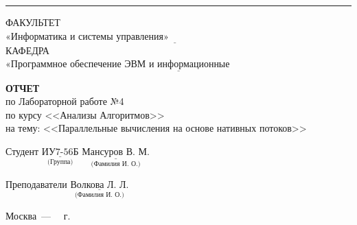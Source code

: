 \begin{titlepage}
	\noindent\rule{18cm}{3pt}
	\newline\newline
	\noindent ФАКУЛЬТЕТ $\underline{\text{«Информатика и системы управления»~~~~~~~~~~~~~~~~~~~~~~~~~~~~~~~~~~~~~~~~~~~~~~~~~~~~~~~}}$ \newline\newline
	\noindent КАФЕДРА $\underline{\text{«Программное обеспечение ЭВМ и информационные технологии»~~~~~~~~~~~~~~~~~~~~~~~}}$\newline\newline\newline\newline\newline\newline\newline
	
	
	\begin{center}
		\textbf{ОТЧЕТ} \\
		по Лабораторной работе №4\\
		по курсу <<Анализы Алгоритмов>> \\
		на тему: <<Параллельные вычисления на основе нативных потоков>>
	\end{center}

	\vfill
	\vfill
	\vfill
	Студент $\underset{\text{(Группа)}}{\underline{\text{ИУ7-56Б}}}$
	\hfill
	$\underset{\text{(Фамилия~И.~О.)}}{\underline{\text{Мансуров~В.~М.}}}$
	
	Преподаватели 
	\hfill
	$\underset{\text{(Фамилия~И.~О.)}}{\underline{\text{Волкова~Л.~Л.}}}$
	
	\begin{center}
		\vfill
		Москва~---~\the\year
		~г.
	\end{center}
	\restoregeometry
\end{titlepage}

